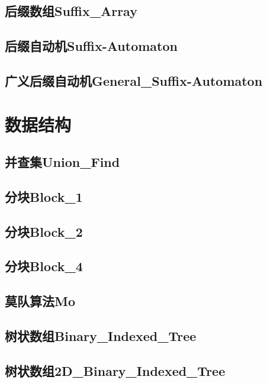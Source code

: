 \documentclass[10pt,a4paper]{article}
\begin{document}
\subsection{后缀数组Suffix\_Array}

\subsection{后缀自动机Suffix-Automaton}

\subsection{广义后缀自动机General\_Suffix-Automaton}


\newpage
\section{数据结构}
\subsection{并查集Union\_Find}

\subsection{分块Block\_1}

\subsection{分块Block\_2}

\subsection{分块Block\_4}

\subsection{莫队算法Mo}

\subsection{树状数组Binary\_Indexed\_Tree}

\subsection{树状数组2D\_Binary\_Indexed\_Tree}

\end{document}
